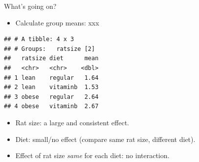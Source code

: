 \documentclass[ignorenonframetext,]{beamer}
\newenvironment{Shaded}{\begin{snugshade}}{\end{snugshade}}
\newcommand{\DataTypeTok}[1]{\textcolor[rgb]{0.13,0.29,0.53}{#1}}
\newcommand{\KeywordTok}[1]{\textcolor[rgb]{0.13,0.29,0.53}{\textbf{#1}}}
\newcommand{\NormalTok}[1]{#1}
\newcommand{\OperatorTok}[1]{\textcolor[rgb]{0.81,0.36,0.00}{\textbf{#1}}}
\newcommand{\StringTok}[1]{\textcolor[rgb]{0.31,0.60,0.02}{#1}}
\providecommand{\tightlist}{%
  \setlength{\itemsep}{0pt}\setlength{\parskip}{0pt}}
\begin{document}
\begin{frame}[fragile]{What's going on?}
\protect\hypertarget{whats-going-on}{}

\begin{itemize}
\tightlist
\item
  Calculate group means: xxx
\end{itemize}

\footnotesize

\begin{Shaded}
\end{Shaded}

\begin{verbatim}
## # A tibble: 4 x 3
## # Groups:   ratsize [2]
##   ratsize diet      mean
##   <chr>   <chr>    <dbl>
## 1 lean    regular   1.64
## 2 lean    vitaminb  1.53
## 3 obese   regular   2.64
## 4 obese   vitaminb  2.67
\end{verbatim}

\normalsize

\begin{itemize}
\item
  Rat size: a large and consistent effect.
\item
  Diet: small/no effect (compare same rat size, different diet).
\item
  Effect of rat size \emph{same} for each diet: no interaction.
\end{itemize}

\end{frame}
\end{document}
